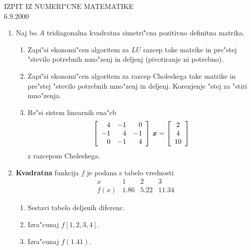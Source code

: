 \documentclass[12pt,a4paper]{article}
\begin{document}
  \begin{center}
    {\Large IZPIT IZ NUMERI"CNE MATEMATIKE}\\
    6.9.2000
  \end{center}
\begin{enumerate}

  \item Naj bo $A$ tridiagonalna kvadratna simetri"cna pozitivno definitna 
  matrika.   

    \begin{enumerate}
       
    \item Zapi"si ekonomi"cen algoritem za $LU$ razcep take matrike
      in pre"stej "stevilo potrebnih mno"zenj in deljenj (pivotiranje ni 
      potrebno).
    \item Zapi"si ekonomi"cen algoritem za razcep Choleskega take matrike
      in pre"stej "stevilo potrebnih mno"zenj in deljenj. Korenjenje "stej
      za "stiri mno"zenja.
    \item Re"si sistem linearnih ena"cb 
      \begin{displaymath}
        \left[
        \begin{array}{rrr}
          4&-1&0\\
          -1&4&-1\\
          0&-1&4
        \end{array}
        \right]\,\mbox{\boldmath{$x$}}=
        \left[
        \begin{array}{c}
          2\\ 4\\ 10
        \end{array}
        \right]
      \end{displaymath}
    z razcepom Choleskega. 
    
    \end{enumerate}

  \item \textbf{Kvadratna} funkcija $f$ je podana s tabelo vrednosti
    \begin{displaymath}
      \begin{array}{c|ccc}
        x&1&2&3\\
        \hline
        f(x)&1.86&5.22&11.34
      \end{array}
    \end{displaymath}
        
    \begin{enumerate}
    
    \item Sestavi tabelo deljenih diferenc.

    \item Izra"cunaj $f[1,2,3,4]$.     
           
    \item Izra"cunaj $f(1.41)$.
          

    \end{enumerate}

\end{enumerate}
\end{document}
